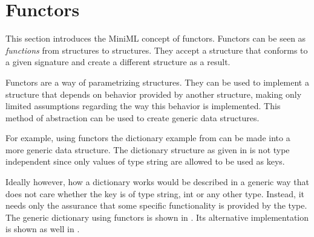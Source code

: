 \section{Functors}
\label{sec:Functors}
This section introduces the MiniML concept of functors. Functors can be seen as \emph{functions} from structures to structures.
They accept a structure that conforms to a given signature and create a different structure as a result.

Functors are a way of parametrizing structures.
They can be used to implement a structure that depends on behavior provided by another structure, making only limited assumptions regarding the way this behavior is implemented.
This method of abstraction can be used to create generic data structures.

For example, using functors the dictionary example from  can be made into a more generic data structure. 
The dictionary structure as given in  is not type independent since only values of type string are allowed to be used as keys.

Ideally however, how a dictionary works would be described in a generic way that does not care whether the key is of type string, int or any other type.
Instead, it needs only the assurance that some specific functionality is provided by the type.
The generic dictionary using functors is shown in . 
Its alternative implementation is shown as well in .

